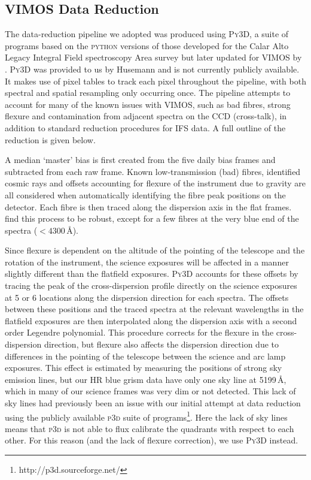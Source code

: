 	\subsection{VIMOS Data Reduction}
		\label{subsec:VIMOSreduction}
		The data-reduction pipeline we adopted was produced using \textsc{Py3D}, a suite of programs based on the \textsc{python} versions of those developed for the Calar Alto Legacy Integral Field spectroscopy Area survey \citep[CALIFA;][]{Sanchez2012, Husemann2013} but later updated for VIMOS by \citet{Husemann2014}. \textsc{Py3D} was provided to us by Husemann and is not currently publicly available. It  makes use of pixel tables to track each pixel throughout the pipeline, with both spectral and spatial resampling only occurring once. The pipeline attempts to account for many of the known issues with VIMOS, such as bad fibres, strong flexure and contamination from adjacent spectra on the CCD (cross-talk), in addition to standard reduction procedures for IFS data. A full outline of the reduction is given below.

		A median `master' bias is first created from the five daily bias frames and subtracted from each raw frame. Known low-transmission (bad) fibres, identified cosmic rays and offsets accounting for flexure of the instrument due to gravity are all considered when automatically identifying the fibre peak positions on the detector. Each fibre is then traced along the dispersion axis in the flat frames. \citet{Husemann2014} find this process to be robust, except for a few fibres at the very blue end of the spectra ($<4300$\,\AA). 

		Since flexure is dependent on the altitude of the pointing of the telescope and the rotation of the instrument, the science exposures will be affected in a manner slightly different than the flatfield exposures. \textsc{Py3D} accounts for these offsets by tracing the peak of the cross-dispersion profile directly on the science exposures at 5 or 6 locations along the dispersion direction for each spectra. The offsets between these positions and the traced spectra at the relevant wavelengths in the flatfield exposures are then interpolated along the dispersion axis with a second order Legendre polynomial. This procedure corrects for the flexure in the cross-dispersion direction, but flexure also affects the dispersion direction due to differences in the pointing of the telescope between the science and arc lamp exposures. This effect is estimated by measuring the positions of strong sky emission lines, but our HR blue grism data have only one sky line at 5199\,\AA, which in many of our science frames was very dim or not detected. This lack of sky lines had previously been an issue with our initial attempt at data reduction using the publicly available \textsc{p3d} suite of programs\footnote{http://p3d.sourceforge.net/}. Here the lack of sky lines means that \textsc{p3d} is not able to flux calibrate the quadrants with respect to each other. For this reason (and the lack of flexure correction), we use \textsc{Py3D} instead.

